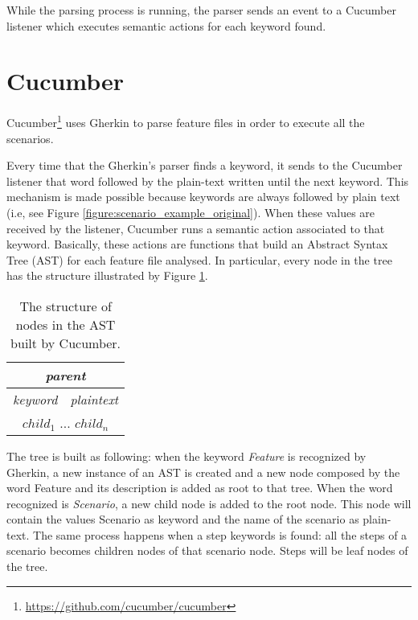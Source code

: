 While the parsing process is running, the parser sends an event to a Cucumber listener which executes semantic actions for each keyword found.

\newpage
\section{Cucumber}

Cucumber\footnote{\url{https://github.com/cucumber/cucumber}} uses Gherkin to parse feature files in order to execute all the scenarios.

Every time that the Gherkin's parser finds a keyword, it sends to the Cucumber listener that word followed by the plain-text written until the next keyword. This mechanism is made possible because keywords are always followed by plain text (i.e, see Figure \ref{figure:scenario_example_original}). When these values are received by the listener, Cucumber runs a semantic action associated to that keyword. Basically, these actions are functions that build an Abstract Syntax Tree (AST) for each feature file analysed. In particular, every node in the tree has the structure illustrated by Figure \ref{table:node_structure}.

\begin{table}[h!]
	\renewcommand*\arraystretch{1.3}
	\begin{center}
	\begin{tabular}{|c|c|}
		\hline
		\multicolumn{2}{|c|}{\textit{parent}} \\ \hline
		\textit{keyword} & \textit{plaintext} \\ \hline
		\multicolumn{2}{|c|}{$child_1$ ... $child_n$} \\ \hline
	\end{tabular}
	\caption{The structure of nodes in the AST built by Cucumber.}
	\label{table:node_structure}
	\end{center}
\end{table}

The tree is built as following: when the keyword \textit{Feature} is recognized by Gherkin, a new instance of an AST is created and a new node composed by the word Feature and its description is added as root to that tree.
When the word recognized is \textit{Scenario}, a new child node is added to the root node. This node will contain the values Scenario as keyword and the name of the scenario as plain-text. The same process happens when a step keywords is found: all the steps of a scenario becomes children nodes of that scenario node. Steps will be leaf nodes of the tree.

